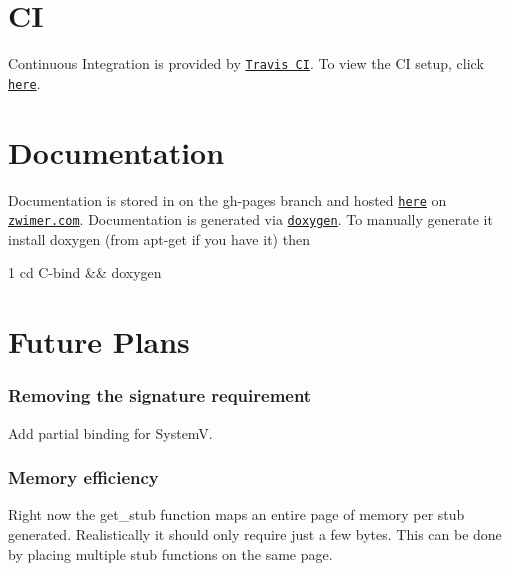 \section*{CI}

Continuous Integration is provided by \href{https://travis-ci.org}{\tt Travis CI}. To view the CI setup, click \href{https://travis-ci.org/zwimer/C-bind/}{\tt here}.

\section*{Documentation}

Documentation is stored in on the {\ttfamily gh-\/pages} branch and hosted \href{https://zwimer.github.io/C-bind/docs/html/index.html}{\tt here} on \href{https://zwimer.com}{\tt zwimer.\+com}. Documentation is generated via \href{http://www.doxygen.nl/}{\tt doxygen}. To manually generate it install doxygen (from {\ttfamily apt-\/get} if you have it) then 
\begin{DoxyCode}
1 cd C-bind && doxygen
\end{DoxyCode}


\section*{Future Plans}

\subsubsection*{Removing the signature requirement}

Add partial binding for SystemV.

\subsubsection*{Memory efficiency}

Right now the {\ttfamily get\+\_\+stub} function maps an entire page of memory per stub generated. Realistically it should only require just a few bytes. This can be done by placing multiple stub functions on the same page. 